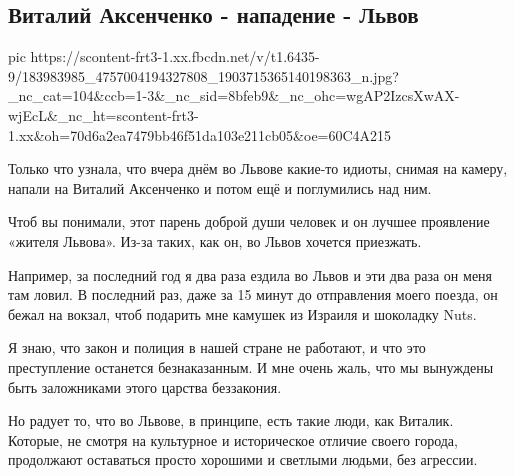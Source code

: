 
 
 
 
 
\subsection{Виталий Аксенченко - нападение - Львов}
\label{sec:10_05_2021.fb.beloglazova_antonina.1.lvov_napadenie}

\ifcmt
  pic https://scontent-frt3-1.xx.fbcdn.net/v/t1.6435-9/183983985_4757004194327808_1903715365140198363_n.jpg?_nc_cat=104&ccb=1-3&_nc_sid=8bfeb9&_nc_ohc=wgAP2IzcsXwAX-wjEcL&_nc_ht=scontent-frt3-1.xx&oh=70d6a2ea7479bb46f51da103e211cb05&oe=60C4A215
\fi


Только что узнала, что вчера днём во Львове какие-то идиоты, снимая на камеру,
напали на Виталий Аксенченко и потом ещё и поглумились над ним. 

Чтоб вы понимали, этот парень доброй души человек и он лучшее проявление
«жителя Львова». Из-за таких, как он, во Львов хочется приезжать. 

Например, за последний год я два раза ездила во Львов и эти два раза он меня
там ловил. В последний раз, даже за 15 минут до отправления моего поезда, он
бежал на вокзал, чтоб подарить мне камушек из Израиля и шоколадку Nuts. 

Я знаю, что закон и полиция в нашей стране не работают, и что это преступление
останется безнаказанным. И мне очень жаль, что мы вынуждены быть заложниками
этого царства беззакония.

Но радует то, что во Львове, в принципе, есть такие люди, как Виталик. Которые,
не смотря на культурное и историческое отличие своего города, продолжают
оставаться просто хорошими и светлыми людьми, без агрессии.
